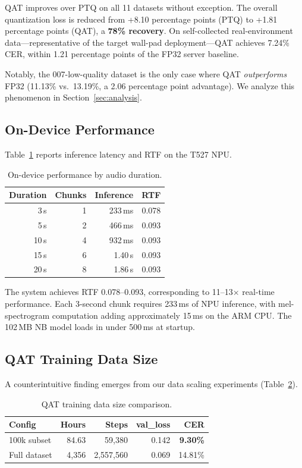 \documentclass[a4paper,11pt,twocolumn]{article}
\begin{document}
QAT improves over PTQ on all 11 datasets without exception. The overall quantization loss is reduced from +8.10 percentage points (PTQ) to +1.81 percentage points (QAT), a \textbf{78\% recovery}. On self-collected real-environment data---representative of the target wall-pad deployment---QAT achieves 7.24\% CER, within 1.21 percentage points of the FP32 server baseline.

Notably, the 007-low-quality dataset is the only case where QAT \textit{outperforms} FP32 (11.13\% vs.\ 13.19\%, a 2.06 percentage point advantage). We analyze this phenomenon in Section~\ref{sec:analysis}.

\subsection{On-Device Performance}

Table~\ref{tab:rtf} reports inference latency and RTF on the T527 NPU.

\begin{table}[t]
\centering
\caption{On-device performance by audio duration.}
\label{tab:rtf}
\small
\begin{tabular}{@{}rrrr@{}}
\toprule
Duration & Chunks & Inference & RTF \\
\midrule
3\,s & 1 & 233\,ms & 0.078 \\
5\,s & 2 & 466\,ms & 0.093 \\
10\,s & 4 & 932\,ms & 0.093 \\
15\,s & 6 & 1.40\,s & 0.093 \\
20\,s & 8 & 1.86\,s & 0.093 \\
\bottomrule
\end{tabular}
\end{table}

The system achieves RTF 0.078--0.093, corresponding to 11--13$\times$ real-time performance. Each 3-second chunk requires 233\,ms of NPU inference, with mel-spectrogram computation adding approximately 15\,ms on the ARM CPU. The 102\,MB NB model loads in under 500\,ms at startup.

\subsection{QAT Training Data Size}

A counterintuitive finding emerges from our data scaling experiments (Table~\ref{tab:datasize}).

\begin{table}[t]
\centering
\caption{QAT training data size comparison.}
\label{tab:datasize}
\small
\begin{tabular}{@{}lrrrr@{}}
\toprule
Config & Hours & Steps & val\_loss & CER \\
\midrule
100k subset & 84.63 & 59,380 & 0.142 & \textbf{9.30\%} \\
Full dataset & 4,356 & 2,557,560 & 0.069 & 14.81\% \\
\bottomrule
\end{tabular}
\end{table}
\end{document}
